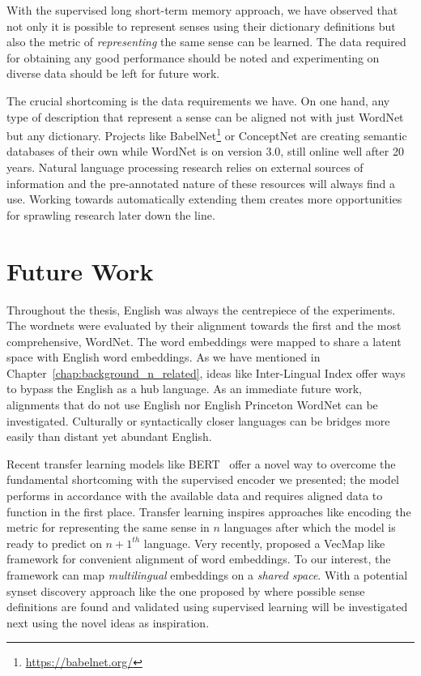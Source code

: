 With the supervised long short-term memory approach, we have observed that not only it is possible to represent senses using their dictionary definitions but also the metric of \emph{representing} the same sense can be learned.
The data required for obtaining any good performance should be noted and experimenting on diverse data should be left for future work.

The crucial shortcoming is the data requirements we have.
On one hand, any type of description that represent a sense can be aligned not with just WordNet but any dictionary.
Projects like BabelNet\footnote{\url{https://babelnet.org/}} or ConceptNet are creating semantic databases of their own while WordNet is on version 3.0, still online well after 20 years.
Natural language processing research relies on external sources of information and the pre-annotated nature of these resources will always find a use.
Working towards automatically extending them creates more opportunities for sprawling research later down the line.

\section{Future Work}%
\label{sec:future_work}

Throughout the thesis, English was always the centrepiece of the experiments.
The wordnets were evaluated by their alignment towards the first and the most comprehensive, WordNet.
The word embeddings were mapped to share a latent space with English word embeddings.
As we have mentioned in Chapter~\ref{chap:background_n_related}, ideas like Inter-Lingual Index offer ways to bypass the English as a hub language.
As an immediate future work, alignments that do not use English nor English Princeton WordNet can be investigated.
Culturally or syntactically closer languages can be bridges more easily than distant yet abundant English.

Recent transfer learning models like BERT~\cite{devlin_bert_2018} offer a novel way to overcome the fundamental shortcoming with the supervised encoder we presented;
the model performs in accordance with the available data and requires aligned data to function in the first place.
Transfer learning inspires approaches like encoding the metric for representing the same sense in $n$ languages after which the model is ready to predict on $n+1^{th}$ language.
Very recently, \textcite{jawanpuria_learning_2019} proposed a VecMap like framework for convenient alignment of word embeddings.
To our interest, the framework can map \emph{multilingual} embeddings on a \emph{shared space}.
With a potential synset discovery approach like the one proposed by \textcite{ruiz-casado_automatic_2005} where possible sense definitions are found and validated using supervised learning will be investigated next using the novel ideas as inspiration.
